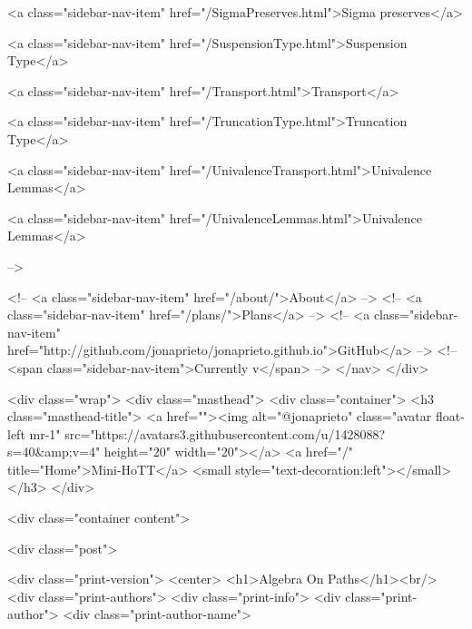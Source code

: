       
        
          <a class="sidebar-nav-item" href="/SigmaPreserves.html">Sigma preserves</a>
        
      
    
      
        
          <a class="sidebar-nav-item" href="/SuspensionType.html">Suspension Type</a>
        
      
    
      
        
          <a class="sidebar-nav-item" href="/Transport.html">Transport</a>
        
      
    
      
        
          <a class="sidebar-nav-item" href="/TruncationType.html">Truncation Type</a>
        
      
    
      
        
          <a class="sidebar-nav-item" href="/UnivalenceTransport.html">Univalence Lemmas</a>
        
      
    
      
        
          <a class="sidebar-nav-item" href="/UnivalenceLemmas.html">Univalence Lemmas</a>
        
      
     -->

    <!-- <a class="sidebar-nav-item" href="/about/">About</a> -->
    <!-- <a class="sidebar-nav-item" href="/plans/">Plans</a> -->
    <!-- <a class="sidebar-nav-item" href="http://github.com/jonaprieto/jonaprieto.github.io">GitHub</a> -->
    <!-- <span class="sidebar-nav-item">Currently v</span> -->
  </nav>
</div>

    <div class="wrap">
      <div class="masthead">
        <div class="container">
          <h3 class="masthead-title">
            <a href=""><img alt="@jonaprieto" class="avatar float-left mr-1" src="https://avatars3.githubusercontent.com/u/1428088?s=40&amp;v=4" height="20" width="20"></a>
            <a href="/" title="Home">Mini-HoTT</a>
            <small style="text-decoration:left"></small>
          </h3>
        </div>
      
      <div class="container content">
        







<div class="post">

  <div class="print-version">
    <center>
      <h1>Algebra On Paths</h1><br/>
        <div class="print-authors">
          <div class="print-info">
            <div class="print-author">
              <div class="print-author-name">
                
